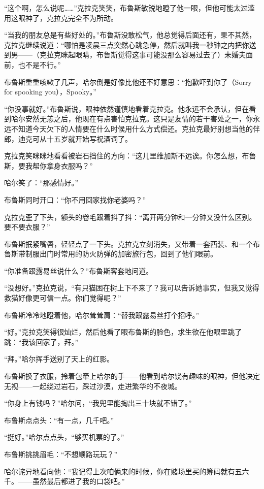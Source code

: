 \documentclass[../main]{subfiles}
\begin{document}
“这个啊，怎么说呢\ldots\ldots”克拉克笑笑，布鲁斯敏锐地瞪了他一眼，但他可能太过滥用这眼神了，克拉克完全不为所动。

“当我的朋友总是有些好处的。”布鲁斯没敢松气，他总觉得后面还有，果不其然，克拉克继续说道：“哪怕是凌晨三点突然心跳急停，然后就叫我一秒钟之内把你送到男——（克拉克眯起眼睛，布鲁斯觉得这事可能没那么容易过去了）未婚夫面前，也不是不行。”

布鲁斯重重咳嗽了几声，哈尔倒是好像比他还不好意思：“抱歉吓到你了（Sorry
for spooking you），Spooky。”

“你没事就好。”布鲁斯说，眼神依然谨慎地看着克拉克。他永远不会承认，但在看到哈尔安然无恙之后，他现在有点害怕克拉克。这只是友情的若干害处之一，你永远不知道今天欠下的人情要在什么时候用什么方式偿还。克拉克最好别想当他的伴郎，迪克可从十五岁就开始写祝酒词了。

克拉克笑眯眯地看看被岩石挡住的方向：“这儿里维加斯不远诶。你怎么想，布鲁斯，要我帮你拿身衣服吗？”

哈尔笑了：“那感情好。”

布鲁斯同时开口：“你不用回家找你老婆吗？”

克拉克歪了下头，额头的卷毛跟着抖了抖：“离开两分钟和一分钟又没什么区别。要不要衣服？”

布鲁斯抿紧嘴唇，轻轻点了一下头。克拉克立刻消失，又带着一套西装、和一个布鲁斯带制服出门时常用的防火防弹的加密旅行包，回到了他们眼前。

“你准备跟露易丝说什么？”布鲁斯客套地问道。

“没想好。”克拉克说，“有只猫困在树上下不来了？我可以告诉她事实，但我又觉得救猫好像更可信一点。你们觉得呢？”

布鲁斯冷冷地瞪着他，哈尔耸耸肩：“替我跟露易丝打个招呼。”

“好。”克拉克笑得很灿烂，然后他看了眼布鲁斯的脸色，求生欲在他眼里跳了跳：“我该回家了，拜。”

“拜。”哈尔挥手送别了天上的红影。

布鲁斯换了衣服，拎着包牵上哈尔的手——他看到哈尔饶有趣味的眼神，但他决定无视——一起绕过岩石，踩过沙漠，走进繁华的不夜城。

“你身上有钱吗？”哈尔问，“我兜里能掏出三十块就不错了。”

布鲁斯点点头：“有一点，几千吧。”

“挺好。”哈尔点点头，“够买机票的了。”

布鲁斯挑挑眉毛：“不想顺路玩玩？”

哈尔诧异地看向他：“我记得上次咱俩来的时候，你在赌场里买的筹码就有五六千。——虽然最后都进了我的口袋吧。”
\end{document}
